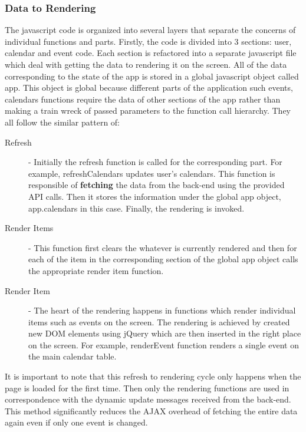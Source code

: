 \documentclass[10pt,a4paper]{article}
\begin{document}
\subsubsection{Data to Rendering}
The javascript code is organized into several layers that separate the concerns of individual functions and parts. Firstly, the code is divided into 3 sections: user, calendar and event code. Each section is refactored into a separate javascript file which deal with getting the data to rendering it on the screen. All of the data corresponding to the state of the app is stored in a global javascript object called app. This object is global because different parts of the application such events, calendars functions require the data of other sections of the app rather than making a train wreck of passed parameters to the function call hierarchy. They all follow the similar pattern of:
\begin{description}
\item[Refresh] - Initially the refresh function is called for the corresponding part. For example, refreshCalendars updates user's calendars. This function is responsible of \textbf{fetching} the data from the back-end using the provided API calls. Then it stores the information under the global app object, app.calendars in this case. Finally, the rendering is invoked.
\item[Render Items] - This function first clears the whatever is currently rendered and then for each of the item in the corresponding section of the global app object calls the appropriate render item function.
\item[Render Item] - The heart of the rendering happens in functions which render individual items such as events on the screen. The rendering is achieved by created new DOM elements using jQuery which are then inserted in the right place on the screen. For example, renderEvent function renders a single event on the main calendar table.
\end{description}
It is important to note that this refresh to rendering cycle only happens when the page is loaded for the first time. Then only the rendering functions are used in correspondence with the dynamic update messages received from the back-end. This method significantly reduces the AJAX overhead of fetching the entire data again even if only one event is changed.
\end{document}
